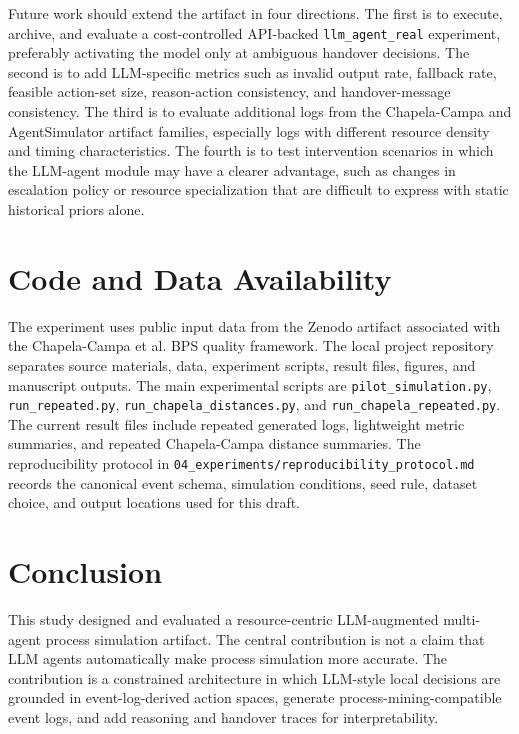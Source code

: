 Future work should extend the artifact in four directions. The first is
to execute, archive, and evaluate a cost-controlled API-backed
\texttt{llm\_agent\_real} experiment, preferably activating the model
only at ambiguous handover decisions. The second is to add LLM-specific
metrics such as invalid output rate, fallback rate, feasible action-set
size, reason-action consistency, and handover-message consistency. The
third is to evaluate additional logs from the Chapela-Campa and
AgentSimulator artifact families, especially logs with different
resource density and timing characteristics. The fourth is to test intervention scenarios in which
the LLM-agent module may have a clearer advantage, such as changes in
escalation policy or resource specialization that are difficult to
express with static historical priors alone.

\section{Code and Data Availability}\label{code-and-data-availability}

The experiment uses public input data from the Zenodo artifact associated
with the Chapela-Campa et al. BPS quality framework. The local project
repository separates source materials, data, experiment scripts, result
files, figures, and manuscript outputs. The main experimental scripts are
\texttt{pilot\_simulation.py}, \texttt{run\_repeated.py},
\texttt{run\_chapela\_distances.py}, and
\texttt{run\_chapela\_repeated.py}. The current result files include
repeated generated logs, lightweight metric summaries, and repeated
Chapela-Campa distance summaries. The reproducibility protocol in
\texttt{04\_experiments/reproducibility\_protocol.md} records the
canonical event schema, simulation conditions, seed rule, dataset choice,
and output locations used for this draft.

\section{Conclusion}\label{conclusion}

This study designed and evaluated a resource-centric LLM-augmented
multi-agent process simulation artifact. The central contribution is not
a claim that LLM agents automatically make process simulation more
accurate. The contribution is a constrained architecture in which
LLM-style local decisions are grounded in event-log-derived action
spaces, generate process-mining-compatible event logs, and add reasoning
and handover traces for interpretability.

